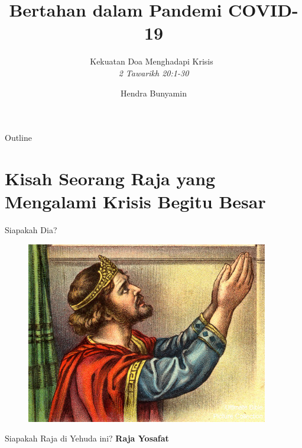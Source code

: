 \documentclass[pdf]{beamer}
\title[Bertahan dalam Pandemi COVID-19] %
{\textbf{Bertahan dalam Pandemi COVID-19}}
\subtitle
{Kekuatan Doa Menghadapi Krisis~\citep{warren2017fortydays} \\ \textit{2 Tawarikh 20:1-30}}
\author[Hendra Bunyamin] %
{Hendra Bunyamin}
\institute[ ] %
{
  Fakultas Ekonomi \\
  Universitas Kristen Maranatha
}
\theoremstyle{mystyle}
\begin{document}
\begin{frame}
  \titlepage
\end{frame}

\begin{frame}{Outline}
  \tableofcontents
\end{frame}






\section{Kisah Seorang Raja yang Mengalami Krisis Begitu Besar}
\begin{frame}{Siapakah Dia?}
	\begin{figure}[!ht]
		\centering
		\includegraphics[scale=1.5]{jehoshaphat}
	\end{figure}
	Siapakah Raja di Yehuda ini? \pause \textbf{Raja Yosafat}	
\end{frame}
\end{document}
